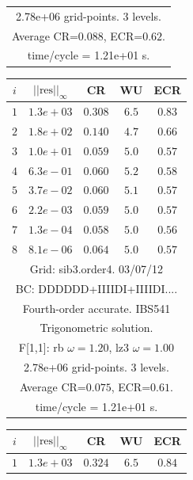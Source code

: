 \begin{table}[hbt]
\begin{center}
{\begin{tabular}{|c|c|c|c|c|}
\multicolumn{5}{|c|}{2.78e+06 grid-points. 3 levels.}  \\
\multicolumn{5}{|c|}{Average CR=$0.088$, ECR=$0.62$.}  \\
\multicolumn{5}{|c|}{time/cycle = 1.21e+01 s.}  \\
\hline 
\end{tabular}
\begin{tabular}{|c|c|c|c|c|} \hline 
 $i$   & $\vert\vert\mbox{res}\vert\vert_\infty$  &  CR     &  WU    & ECR  \\   \hline 
 $ 1$  & $ 1.3e+03$ & $0.308$ & $ 6.5$ & $0.83$ \\ 
 $ 2$  & $ 1.8e+02$ & $0.140$ & $ 4.7$ & $0.66$ \\ 
 $ 3$  & $ 1.0e+01$ & $0.059$ & $ 5.0$ & $0.57$ \\ 
 $ 4$  & $ 6.3e-01$ & $0.060$ & $ 5.2$ & $0.58$ \\ 
 $ 5$  & $ 3.7e-02$ & $0.060$ & $ 5.1$ & $0.57$ \\ 
 $ 6$  & $ 2.2e-03$ & $0.059$ & $ 5.0$ & $0.57$ \\ 
 $ 7$  & $ 1.3e-04$ & $0.058$ & $ 5.0$ & $0.56$ \\ 
 $ 8$  & $ 8.1e-06$ & $0.064$ & $ 5.0$ & $0.57$ \\ 
\hline 
\multicolumn{5}{|c|}{Grid: sib3.order4. 03/07/12}  \\
\multicolumn{5}{|c|}{BC: DDDDDD+IIIIDI+IIIIDI....}  \\
\multicolumn{5}{|c|}{Fourth-order accurate. IBS541 }  \\
\multicolumn{5}{|c|}{Trigonometric solution.}  \\
\multicolumn{5}{|c|}{F[1,1]: rb $\omega=1.20$, lz3 $\omega=1.00$}  \\
\multicolumn{5}{|c|}{2.78e+06 grid-points. 3 levels.}  \\
\multicolumn{5}{|c|}{Average CR=$0.075$, ECR=$0.61$.}  \\
\multicolumn{5}{|c|}{time/cycle = 1.21e+01 s.}  \\
\hline 
\end{tabular}
\begin{tabular}{|c|c|c|c|c|} \hline 
 $i$   & $\vert\vert\mbox{res}\vert\vert_\infty$  &  CR     &  WU    & ECR  \\   \hline 
 $ 1$  & $ 1.3e+03$ & $0.324$ & $ 6.5$ & $0.84$ \\ 

\end{tabular}}
\end{center}
\end{table}
